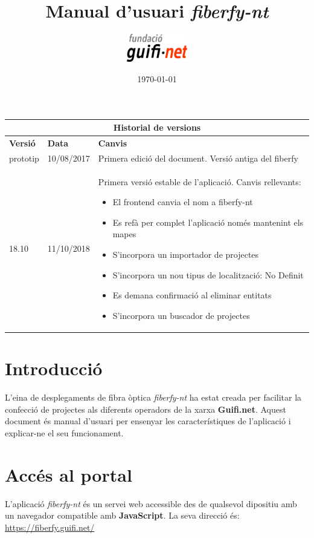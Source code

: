 \documentclass[a4paper]{article}
\author{\includegraphics[width=0.2\textwidth]{images/logo_fundacio.png}
}
\title{\textbf{Manual d'usuari \emph{fiberfy-nt}}}
\date{\today}
\begin{document}
	\maketitle
	\newpage
	
	\begin{center}
		\begin{tabular}{| p{1.89cm} | p{2.21cm} | p{8.42cm} |} \hline
			\multicolumn{3}{|c|}{\large{\textbf{Historial de versions}}} \\ \hline
			\textbf{Versió} & \textbf{Data} & \textbf{Canvis} \\ \hline
			prototip & 10/08/2017 & Primera edició del document. Versió antiga del fiberfy \\ \hline
			18.10 & 11/10/2018 & Primera versió estable de l'aplicació. Canvis rellevants:
			\begin{itemize}
				\item El frontend canvia el nom a fiberfy-nt
				\item Es refà per complet l'aplicació només mantenint els mapes
				\item S'incorpora un importador de projectes
				\item S'incorpora un nou tipus de localització: No Definit
				\item Es demana confirmació al eliminar entitats
				\item S'incorpora un buscador de projectes
			\end{itemize} \\ \hline
		\end{tabular}
	\end{center}
	\newpage
	\tableofcontents
	\newpage
	\onehalfspacing
	
	\section{Introducció}
	L'eina de desplegaments de fibra òptica \emph{fiberfy-nt} ha estat creada per facilitar la confecció de projectes als diferents operadors de la xarxa \textbf{Guifi.net}.
	Aquest document és manual d'usuari per ensenyar les característiques de l'aplicació i explicar-ne el seu funcionament. 
	
	\section{Accés al portal}
	L'aplicació \emph{fiberfy-nt} és un servei web accessible des de qualsevol dipositiu amb un navegador compatible amb \textbf{JavaScript}. La seva direcció és: \url{https://fiberfy.guifi.net/}
	
\end{document}
